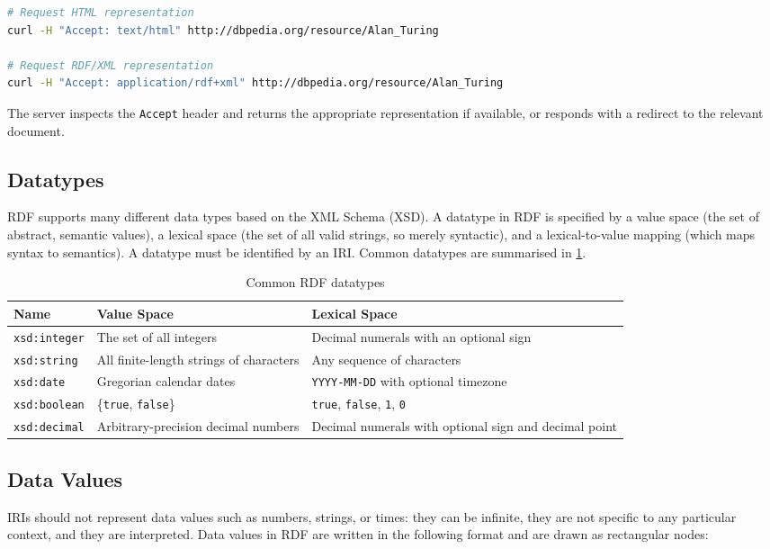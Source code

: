 \begin{lstlisting}[language=bash, caption=Content negotiation with curl]
# Request HTML representation
curl -H "Accept: text/html" http://dbpedia.org/resource/Alan_Turing

# Request RDF/XML representation
curl -H "Accept: application/rdf+xml" http://dbpedia.org/resource/Alan_Turing
\end{lstlisting}

The server inspects the \texttt{Accept} header and returns the appropriate representation if available, or responds with a redirect to the relevant document.

\subsection{Datatypes}
RDF supports many different data types based on the XML Schema (XSD). A datatype in RDF is specified by a value space (the set of abstract, semantic values), a lexical space (the set of all valid strings, so merely syntactic), and a lexical-to-value mapping (which maps syntax to semantics). 
A datatype must be identified by an IRI. Common datatypes are summarised in \cref{tab:datatypes}.

\begin{table}[H]
\centering
\caption{Common RDF datatypes}
\label{tab:datatypes}
\begin{tabular}{@{}p{3.8cm}p{4.2cm}p{5cm}@{}}
\toprule
\textbf{Name} & \textbf{Value Space} & \textbf{Lexical Space} \\
\midrule
\texttt{xsd:integer} & The set of all integers & Decimal numerals with an optional sign \\
\texttt{xsd:string} & All finite-length strings of characters & Any sequence of characters \\
\texttt{xsd:date} & Gregorian calendar dates & \texttt{YYYY-MM-DD} with optional timezone \\
\texttt{xsd:boolean} & \{\texttt{true}, \texttt{false}\} & \texttt{true}, \texttt{false}, \texttt{1}, \texttt{0} \\
\texttt{xsd:decimal} & Arbitrary-precision decimal numbers & Decimal numerals with optional sign and decimal point \\
\bottomrule
\end{tabular}
\end{table}

\subsection{Data Values}
IRIs should not represent data values such as numbers, strings, or times: they can be infinite, they are not specific to any particular context, and they are interpreted. Data values in RDF are written in the following format and are drawn as rectangular nodes: 
\begin{center}
\end{center}

